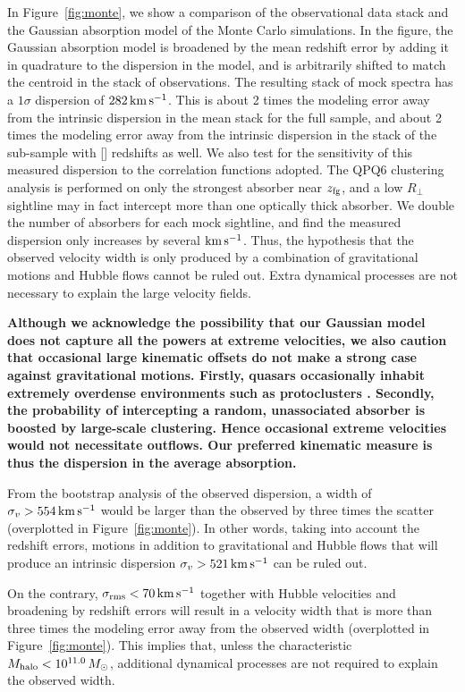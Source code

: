\documentclass[iop]{emulateapj}
\begin{document}
In Figure~\ref{fig:monte}, we show a comparison of the observational data stack and the Gaussian
absorption model of the Monte Carlo simulations. In the figure, the Gaussian absorption model is
broadened by the mean redshift error by adding it in quadrature to the dispersion in the model, and
is arbitrarily shifted to match the centroid in the stack of observations.
The resulting stack of mock spectra has a $1\sigma$ dispersion of $282\,{\rm km\,s^{-1}}$. This is
about 2 times the modeling error away from the intrinsic dispersion in the  mean stack
for the full sample, and about 2 times the modeling error away from the intrinsic dispersion in the
stack of the sub-sample with [] redshifts as well. We also test for the
sensitivity of this measured dispersion to the correlation functions adopted. The QPQ6 clustering
analysis is performed on only the strongest absorber near $z_{\rm fg}$, and a low $R_\perp$
sightline may in fact intercept more than one optically thick absorber. We double the number of
absorbers for each mock sightline, and find the measured dispersion only increases by several
${\rm km\,s^{-1}}$. Thus, the hypothesis that the observed velocity width is only produced by a
combination of gravitational motions and Hubble flows cannot be ruled out. Extra dynamical
processes are not necessary to explain the large velocity fields.

{\bf Although we acknowledge the possibility that our Gaussian model does not capture all the powers
at extreme velocities, we also caution that occasional large kinematic offsets do not make a strong
case against gravitational motions. Firstly, quasars occasionally inhabit extremely overdense environments
such as protoclusters \citep[e.g.,][]{Hennawi+15}. Secondly, the probability of intercepting a random,
unassociated absorber is boosted by large-scale clustering. Hence occasional extreme velocities would not
necessitate outflows. Our preferred kinematic measure is thus the dispersion in the average absorption.}

From the bootstrap analysis of the observed dispersion, a width of
$\sigma_v>554\,{\rm km\,s^{-1}}$ would be larger than the observed by three times the scatter
(overplotted in Figure~\ref{fig:monte}). In other words, taking into account the redshift errors,
motions in addition to gravitational and Hubble flows that will produce an intrinsic dispersion
$\sigma_v>521\,{\rm km\,s^{-1}}$ can be ruled out.

On the contrary,
$\sigma_{\rm rms}<70\,{\rm km\,s^{-1}}$ together with Hubble velocities and
broadening by redshift errors will result in a velocity width that is more than three times the
modeling error away from the observed width (overplotted in Figure~\ref{fig:monte}). This implies
that, unless the characteristic $M_{\rm halo}<10^{11.0}\,M_\odot$,
additional dynamical processes are not required to explain the observed width.
\end{document}

